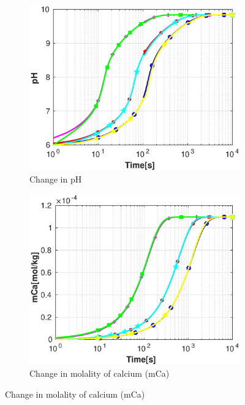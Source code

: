 \begin{figure}[!h]
        \centering
    \begin{subfigure}{.5\linewidth}
            \centering
        \includegraphics[width=\textwidth]{PICTURES/dvm_pH6_pH.eps}
        \caption{\small Change in pH}
        \label{fig:dvmpH6pH}
    \end{subfigure}%
        \hfill
    \begin{subfigure}{.5\linewidth}
            \centering
        \includegraphics[width=\textwidth]{PICTURES/dvm_pH6_mCa.eps}
        \caption{\small Change in molality of calcium (mCa)}
        \label{fig:dvmpH6mCa}

\end{subfigure}
\end{figure}

